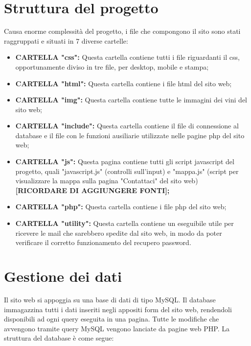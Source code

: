\section{Struttura del progetto}

Causa enorme complessità del progetto, i file che compongono il sito sono stati
raggruppati e situati in 7 diverse cartelle:

\begin{itemize}
	\item \textbf{CARTELLA "css":} Questa cartella contiene tutti i file riguardanti il css, opportunamente diviso in tre file, per desktop, mobile e stampa;
	\item \textbf{CARTELLA "html":} Questa cartella contiene i file html del sito web;
	\item \textbf{CARTELLA "img":} Questa cartella contiene tutte le immagini dei vini del sito web;
	\item \textbf{CARTELLA "include":} Questa cartella contiene il file di connessione al database e il file con le funzioni ausiliarie utilizzate nelle pagine php del sito web;
	\item \textbf{CARTELLA "js":} Questa pagina contiene tutti gli script javascript del progetto, quali "javascript.js" (controlli sull'input) e 
	"mappa.js" (script per visualizzare la mappa sulla pagina "Contattaci" del sito web) \textbf{[RICORDARE DI AGGIUNGERE FONTI];}
	\item \textbf{CARTELLA "php":} Questa cartella contiene i file php del sito web;
	\item \textbf{CARTELLA "utility":} Questa cartella contiene un eseguibile utile per ricevere le mail che sarebbero spedite dal sito web, in modo da poter verificare il corretto funzionamento del recupero password.
\end{itemize}

\section{Gestione dei dati}

Il sito web si appoggia su una base di dati di tipo MySQL. Il database immagazzina tutti i dati inseriti negli appositi form del sito web, rendendoli disponibili ad ogni query eseguita in una pagina. Tutte le modifiche che avvengono tramite query MySQL vengono lanciate da pagine web PHP. La struttura del database è come segue:

